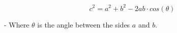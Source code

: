 \vspace{1em}
\sffamily
\bgroup

$$c^2 = a^2 + b^2 - 2 a b \cdot cos(\theta)$$

- Where $\theta$ is the angle between the sides $a$ and $b$.

\egroup
\vspace{1em}